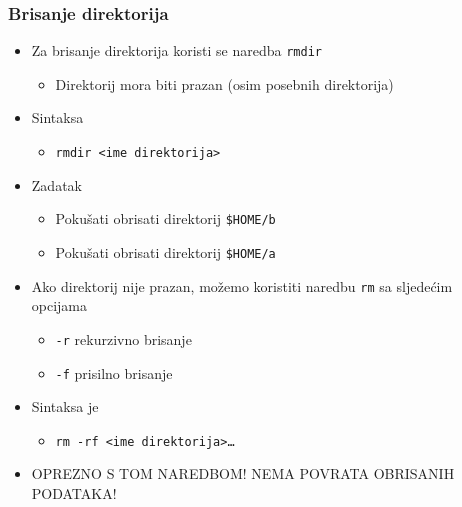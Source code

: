 \documentclass{beamer}
\begin{document}
\begin{frame}[t]
\frametitle{Brisanje direktorija}
\begin{itemize}
  \item Za brisanje direktorija koristi se naredba \texttt{rmdir}
  \begin{itemize}
    \item Direktorij mora biti prazan (osim posebnih direktorija)
  \end{itemize}
  \item Sintaksa
  \begin{itemize}
    \item[] \texttt{rmdir \textless ime direktorija\textgreater}
  \end{itemize}
  \item Zadatak
  \begin{itemize}
    \item Pokušati obrisati direktorij \texttt{\$HOME/b}
    \item Pokušati obrisati direktorij \texttt{\$HOME/a}
  \end{itemize}
   \item Ako direktorij nije prazan, možemo koristiti naredbu \texttt{rm}
        sa sljedećim opcijama
  \begin{itemize}
    \item \texttt{-r} rekurzivno brisanje
    \item \texttt{-f} prisilno brisanje
  \end{itemize}
  \item Sintaksa je
  \begin{itemize}
    \item[] \texttt{rm -rf \textless ime direktorija\textgreater\ldots}
  \end{itemize}
  \item[] OPREZNO S TOM NAREDBOM! NEMA POVRATA OBRISANIH PODATAKA!
\end{itemize}
\end{frame}
\end{document}
